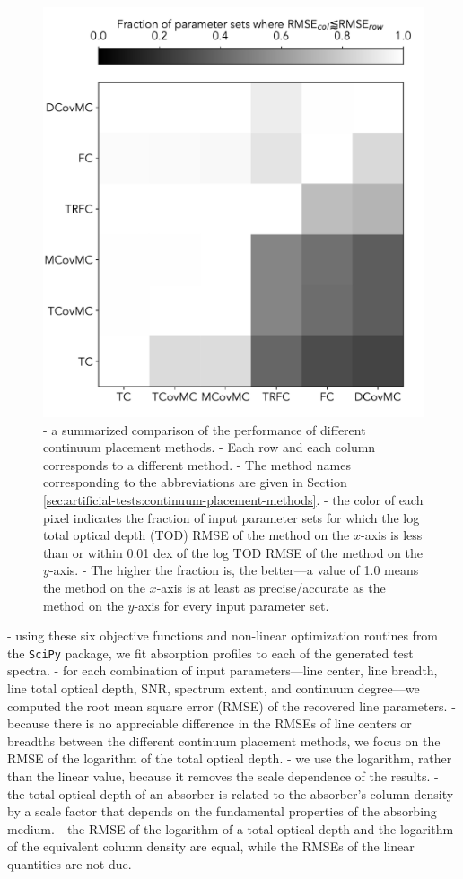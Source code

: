 \documentclass[trackchanges]{aastex62}
\begin{document}
{\begin{figure}
  \includegraphics[width=\linewidth]{figures/overall-performance.pdf}
  \caption{
  - a summarized comparison of the performance of different continuum placement methods.
  - Each row and each column corresponds to a different method.
  - The method names corresponding to the abbreviations are given in Section \ref{sec:artificial-tests:continuum-placement-methods}.
  - the color of each pixel indicates the fraction of input parameter sets for which the log total optical depth (TOD) RMSE of the method on the $x$-axis is less than or within 0.01 dex of the log TOD RMSE of the method on the $y$-axis.
  - The higher the fraction is, the better---a value of 1.0 means the method on the $x$-axis is at least as precise/accurate as the method on the $y$-axis for every input parameter set.
  }
  \label{fig:outcomes-summary}
\end{figure}
- using these six objective functions and non-linear optimization routines from the \texttt{SciPy} package, we fit absorption profiles to each of the generated test spectra.
- for each combination of input parameters---line center, line breadth, line total optical depth, SNR, spectrum extent, and continuum degree---we computed the root mean square error (RMSE) of the recovered line parameters.
- because there is no appreciable difference in the RMSEs of line centers or breadths between the different continuum placement methods, we focus on the RMSE of the logarithm of the total optical depth.
- we use the logarithm, rather than the linear value, because it removes the scale dependence of the results.
- the total optical depth of an absorber is related to the absorber's column density by a scale factor that depends on the fundamental properties of the absorbing medium.
- the RMSE of the logarithm of a total optical depth and the logarithm of the equivalent column density are equal, while the RMSEs of the linear quantities are not due.

}
\end{document}
